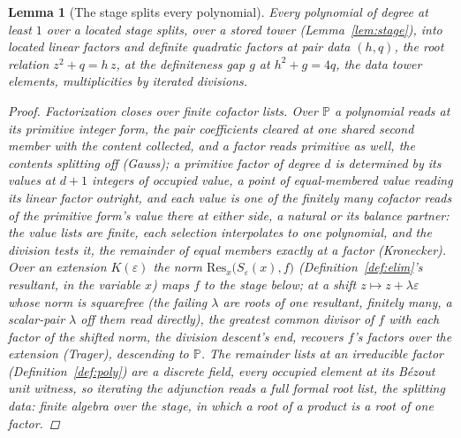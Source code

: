 \documentclass[11pt]{article}
\newtheorem{lemma}{Lemma}
\theoremstyle{definition}
\begin{document}
\begin{lemma}[The stage splits every polynomial]\label{lem:stagesplit}
Every polynomial of degree at least $1$ over a located stage splits,
over a stored tower (Lemma~\ref{lem:stage}), into located linear
factors and \emph{definite} quadratic factors at pair data $(h,q)$,
the root relation $z^2+q=h\,z$, at the definiteness gap $g$ at
$h^2+g=4q$, the data tower elements, multiplicities by
iterated divisions.
\begin{proof}
\emph{Factorization closes over finite cofactor lists.} Over
$\mathbb P$ a polynomial reads at its primitive integer form, the
pair coefficients cleared at one shared second member with the
content collected, and a factor reads primitive as well, the
contents splitting off (Gauss); a primitive factor of degree $d$ is
determined by its values at $d+1$ integers of occupied value, a
point of equal-membered value reading its linear factor outright,
and each value is one of the finitely many cofactor reads of the
primitive form's value there at either side, a natural or its
balance partner: the value lists are finite, each selection
interpolates to one polynomial, and the division tests it,
the remainder of equal members exactly at a factor
(Kronecker). Over an extension $K(\varepsilon)$ the norm
$\mathrm{Res}_x\big(S_\varepsilon(x),f\big)$
(Definition~\ref{def:elim}'s resultant, in the variable $x$) maps
$f$ to the
stage below; at a shift $z\mapsto z+\lambda\varepsilon$ whose norm
is squarefree (the failing $\lambda$ are roots of one resultant,
finitely many, a scalar-pair $\lambda$ off them read directly), the
greatest common divisor of $f$ with each factor of the shifted
norm, the division descent's end, recovers $f$'s factors
over the extension (Trager), descending to $\mathbb P$. The
remainder lists at an
irreducible factor (Definition~\ref{def:poly}) are a
discrete field, every occupied element at its B\'ezout
unit witness, so iterating the adjunction reads a full formal root
list, the \emph{splitting data}: finite
algebra over the stage, in which a root of a product is a root of
one factor.


\end{proof}
\end{lemma}
\end{document}
